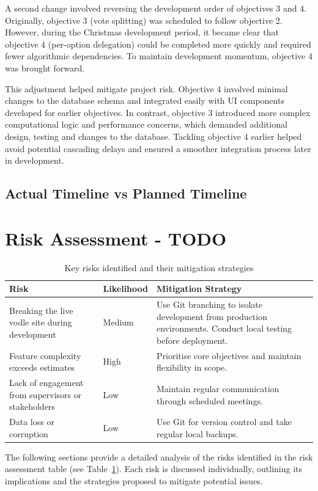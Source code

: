 A second change involved reversing the development order of objectives 3 and 4. Originally, objective 3 (vote splitting) was scheduled to follow objective 2. However, during the Christmas development period, it became clear that objective 4 (per-option delegation) could be completed more quickly and required fewer algorithmic dependencies. To maintain development momentum, objective 4 was brought forward.

This adjustment helped mitigate project risk. Objective 4 involved minimal changes to the database schema and integrated easily with UI components developed for earlier objectives. In contrast, objective 3 introduced more complex computational logic and performance concerns, which demanded additional design, testing and changes to the database. Tackling objective 4 earlier helped avoid potential cascading delays and ensured a smoother integration process later in development.

\subsection{Actual Timeline vs Planned Timeline}
\section{Risk Assessment - TODO}
\begin{table}[H]
\centering
\begin{tabular}{|p{4.5cm}|p{2cm}|p{8cm}|}
\hline
\textbf{Risk} & \textbf{Likelihood} & \textbf{Mitigation Strategy} \\
\hline
Breaking the live vodle site during development & Medium & Use Git branching to isolate development from production environments. Conduct local testing before deployment. \\
\hline
Feature complexity exceeds estimates & High & Prioritise core objectives and maintain flexibility in scope. \\
\hline
Lack of engagement from supervisors or stakeholders & Low & Maintain regular communication through scheduled meetings. \\
\hline
Data loss or corruption & Low & Use Git for version control and take regular local backups. \\
\hline
\end{tabular}
\caption{Key risks identified and their mitigation strategies}\label{tab:risk-assessment}
\end{table}

The following sections provide a detailed analysis of the risks identified in the risk assessment table (see Table~\ref{tab:risk-assessment}). Each risk is discussed individually, outlining its implications and the strategies proposed to mitigate potential issues.

